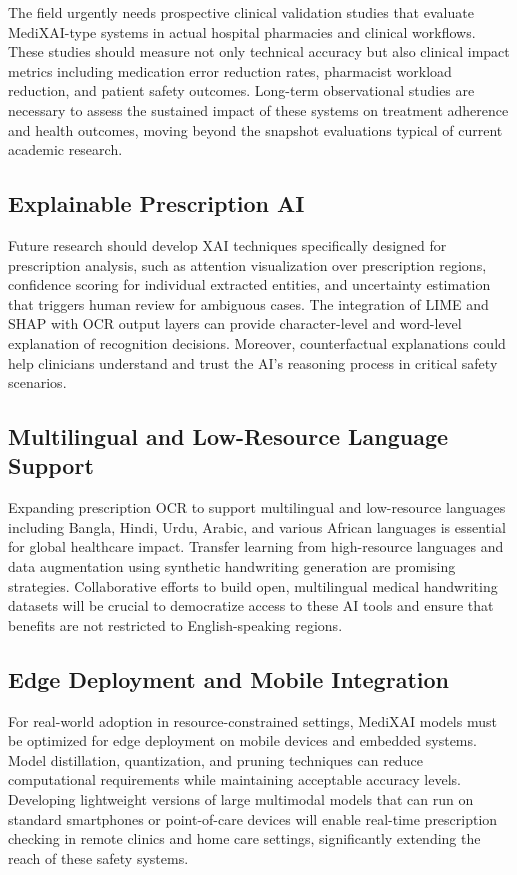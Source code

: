 \documentclass[conference]{IEEEtran}
\begin{document}
The field urgently needs prospective clinical validation studies that evaluate MediXAI-type systems in actual hospital pharmacies and clinical workflows. These studies should measure not only technical accuracy but also clinical impact metrics including medication error reduction rates, pharmacist workload reduction, and patient safety outcomes. Long-term observational studies are necessary to assess the sustained impact of these systems on treatment adherence and health outcomes, moving beyond the snapshot evaluations typical of current academic research.

\subsection{Explainable Prescription AI}

Future research should develop XAI techniques specifically designed for prescription analysis, such as attention visualization over prescription regions, confidence scoring for individual extracted entities, and uncertainty estimation that triggers human review for ambiguous cases. The integration of LIME and SHAP with OCR output layers can provide character-level and word-level explanation of recognition decisions. Moreover, counterfactual explanations could help clinicians understand and trust the AI's reasoning process in critical safety scenarios.

\subsection{Multilingual and Low-Resource Language Support}

Expanding prescription OCR to support multilingual and low-resource languages including Bangla, Hindi, Urdu, Arabic, and various African languages is essential for global healthcare impact. Transfer learning from high-resource languages and data augmentation using synthetic handwriting generation are promising strategies. Collaborative efforts to build open, multilingual medical handwriting datasets will be crucial to democratize access to these AI tools and ensure that benefits are not restricted to English-speaking regions.

\subsection{Edge Deployment and Mobile Integration}

For real-world adoption in resource-constrained settings, MediXAI models must be optimized for edge deployment on mobile devices and embedded systems. Model distillation, quantization, and pruning techniques can reduce computational requirements while maintaining acceptable accuracy levels. Developing lightweight versions of large multimodal models that can run on standard smartphones or point-of-care devices will enable real-time prescription checking in remote clinics and home care settings, significantly extending the reach of these safety systems.
\end{document}
